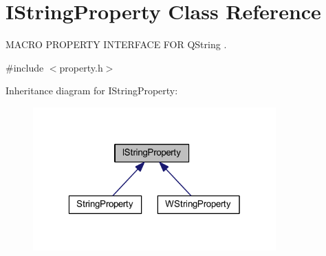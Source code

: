\hypertarget{class_i_string_property}{\section{I\-String\-Property Class Reference}
\label{class_i_string_property}
}


M\-A\-C\-R\-O P\-R\-O\-P\-E\-R\-T\-Y I\-N\-T\-E\-R\-F\-A\-C\-E F\-O\-R Q\-String .  




{\ttfamily \#include $<$property.\-h$>$}



Inheritance diagram for I\-String\-Property\-:
\nopagebreak
\begin{figure}[H]
\begin{center}
\leavevmode
\includegraphics[width=265pt]{class_i_string_property__inherit__graph}
\end{center}
\end{figure}
